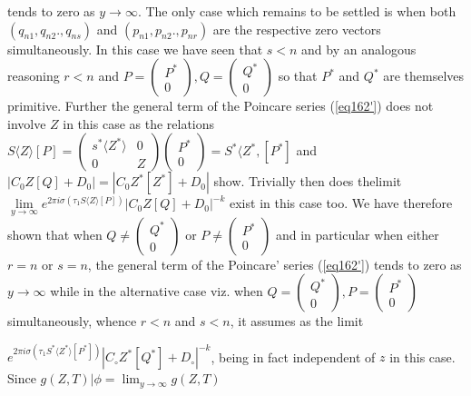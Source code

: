 \noindent
tends to zero as $y \to \infty$. The only case which remains to be
settled is when both $(q_{n1}, q_{n2}., q_{ns})$ and
$(p_{n1}, p_{n2}., p_{nr})$ are the respective zero vectors
simultaneously. In this case we have seen that $s < n$ and by an
analogous reasoning $r < n$ and $P = \begin{pmatrix}P^*
  \\ 0 \end{pmatrix}, Q = \begin{pmatrix}Q^* \\ 0 \end{pmatrix}$ so
that $P^*$ and $Q^*$ are themselves primitive. Further the general
term of the Poincare series (\ref{eq162'}) does not involve $Z$ in this case
as the relations $S \langle Z \rangle [P] = \begin{pmatrix}s^* \langle
  Z^* \rangle & 0 \\ 0 & Z \end{pmatrix} \begin{pmatrix}
  P^*\\ 0 \end{pmatrix} = S^* \langle Z^*, [P^*]$ and $|C_0 Z [Q] +
D_0| = |C_0 Z^*[Z^*]+D_0|$ show. Trivially then does the\pageoriginale limit
$\lim\limits_{y \to \infty}e^{2 \pi i \sigma (\tau_1 S \langle Z \rangle[P])}
|C_0Z[Q]+D_0|^{-k}$ exist in this case too. We have therefore shown
that when $Q \neq \begin{pmatrix}Q^*\\ 0 \end{pmatrix}$ or $P
\neq \begin{pmatrix}P^*\\ 0 \end{pmatrix}$ and in particular when
either $r = n$ or $s = n$, the general term of the Poincare' series
(\ref{eq162'}) tends to zero as $ y \to \infty$ while in the alternative
case viz. when $Q= \begin{pmatrix}Q^*\\ 0 \end{pmatrix},
P=\begin{pmatrix}P^* \\ 0 \end{pmatrix}$ simultaneously, whence $r <
n$ and $s < n$, it assumes as the limit 

\noindent
$e^{2 \pi i \sigma(\tau_1S^* \langle Z^* \rangle
  [P^*])}|C_{\circ}Z^*[Q^*]+D_{\circ}|^{-k}$, being in fact
independent of $z$ in this case. Since $g(Z, T)| \phi = \lim_{y \to
  \infty}g (Z, T)$  

